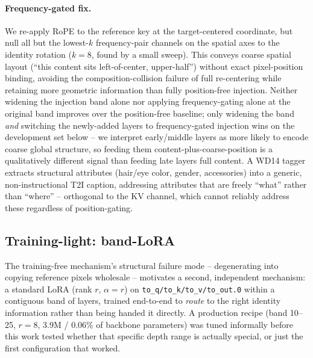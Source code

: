 \paragraph{Frequency-gated fix.} We re-apply RoPE to the reference key at
the target-centered coordinate, but null all but the lowest-$k$
frequency-pair channels on the spatial axes to the identity rotation
($k{=}8$, found by a small sweep). This conveys coarse spatial layout
(``this content sits left-of-center, upper-half'') without exact
pixel-position binding, avoiding the composition-collision failure of
full re-centering while retaining more geometric information than fully
position-free injection. Neither widening the injection band alone nor
applying frequency-gating alone at the original band improves over the
position-free baseline; only widening the band \emph{and} switching the
newly-added layers to frequency-gated injection wins on the development
set below -- we interpret early/middle layers as
more likely to encode coarse global structure, so feeding them
content-plus-coarse-position is a qualitatively different signal than
feeding late layers full content. A WD14 tagger extracts structural
attributes (hair/eye color, gender, accessories) into a generic,
non-instructional T2I caption, addressing attributes that are freely
``what'' rather than ``where'' -- orthogonal to the KV channel, which
cannot reliably address these regardless of position-gating.

\subsection{Training-light: band-LoRA}\label{sec:method-tl}

The training-free mechanism's structural failure mode -- degenerating
into copying reference pixels wholesale -- motivates a second,
independent mechanism: a standard LoRA (rank $r$, $\alpha{=}r$) on
\texttt{to\_q/to\_k/to\_v/to\_out.0} within a contiguous band of layers,
trained end-to-end to \emph{route} to the right identity information
rather than being handed it directly. A production recipe (band 10--25,
$r{=}8$, 3.9M / 0.06\% of backbone parameters) was tuned informally
before this work tested whether that specific depth range is actually
special, or just the first configuration that worked.

